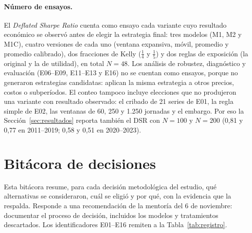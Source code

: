 \documentclass[11pt,a4paper]{article}
\begin{document}
\paragraph{Número de ensayos.} El \emph{Deflated Sharpe Ratio} cuenta como ensayo cada variante cuyo resultado económico se observó antes de elegir la estrategia final: tres modelos (M1, M2 y M1C), cuatro versiones de cada uno (ventana expansiva, móvil, promedio y promedio calibrado), dos fracciones de Kelly (\(\tfrac14\) y \(\tfrac15\)) y dos reglas de exposición (la original y la de utilidad), en total \(N=48\). Los análisis de robustez, diagnóstico y evaluación (E06--E09, E11--E13 y E16) no se cuentan como ensayos, porque no generaron estrategias candidatas: aplican la misma estrategia a otros precios, costos o subperíodos. El conteo tampoco incluye elecciones que no produjeron una variante con resultado observado: el cribado de 21 series de E01, la regla simple de E02, las ventanas de 60, 250 y 1.250 jornadas y el embargo. Por eso la Sección~\ref{sec:resultados} reporta también el DSR con \(N=100\) y \(N=200\) (0,81 y 0,77 en 2011--2019; 0,58 y 0,51 en 2020--2023).

\section{Bitácora de decisiones}\label{app:bitacora}

Esta bitácora resume, para cada decisión metodológica del estudio, qué alternativas se consideraron, cuál se eligió y por qué, con la evidencia que la respalda. Responde a una recomendación de la mentoría del 6 de noviembre: documentar el proceso de decisión, incluidos los modelos y tratamientos descartados. Los identificadores E01--E16 remiten a la Tabla~\ref{tab:registro}.
\end{document}
